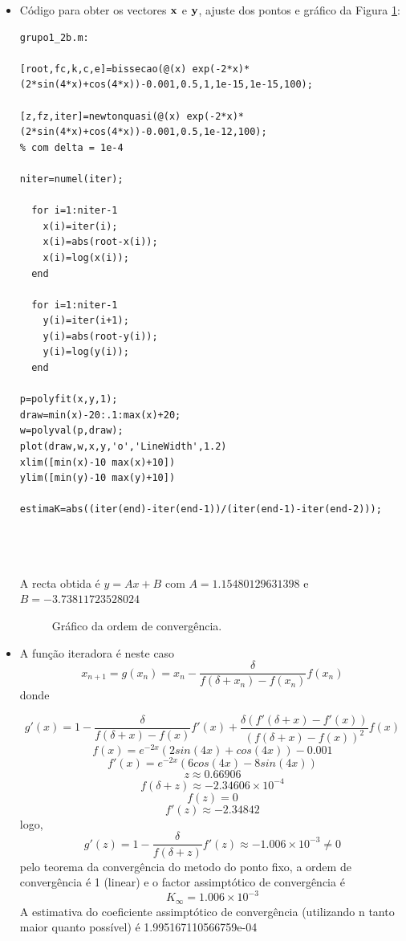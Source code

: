 \documentclass[a4paper,10pt]{extarticle}
\begin{document}
\begin{enumerate}
\begin{enumerate}
\begin{itemize}
\item Código para obter os vectores $\bf x$ e $\bf y$, ajuste dos pontos e gráfico da Figura \ref{fig:figura-pergunta1}:
{\small
\begin{verbatim}
grupo1_2b.m:

[root,fc,k,c,e]=bissecao(@(x) exp(-2*x)*(2*sin(4*x)+cos(4*x))-0.001,0.5,1,1e-15,1e-15,100);

[z,fz,iter]=newtonquasi(@(x) exp(-2*x)*(2*sin(4*x)+cos(4*x))-0.001,0.5,1e-12,100);
% com delta = 1e-4

niter=numel(iter);

  for i=1:niter-1
    x(i)=iter(i);
    x(i)=abs(root-x(i));
    x(i)=log(x(i));
  end

  for i=1:niter-1
    y(i)=iter(i+1);
    y(i)=abs(root-y(i));
    y(i)=log(y(i));
  end
  
p=polyfit(x,y,1);
draw=min(x)-20:.1:max(x)+20;
w=polyval(p,draw);
plot(draw,w,x,y,'o','LineWidth',1.2)
xlim([min(x)-10 max(x)+10])
ylim([min(y)-10 max(y)+10])

estimaK=abs((iter(end)-iter(end-1))/(iter(end-1)-iter(end-2)));




\end{verbatim}
}
A recta obtida é $y=A x+B$ com $A=1.15480129631398$ e $B=-3.73811723528024$
\begin{figure}[htb]
\centerline{ }
\caption{Gráfico da ordem de convergência.}
\label{fig:figura-pergunta1}
\end{figure}
\item A função iteradora é neste caso
\[x_{n+1}=g(x_n)= x_n-\frac{\delta}{f(\delta+x_n)-f(x_n)}f(x_n)
\]
donde 

\[g'(x)=1-\frac{\delta}{f(\delta+x)-f(x)}f'(x)+\frac{\delta(f'(\delta+x)-f'(x))}{(f(\delta+x)-f(x))^2}f(x)
\]
\[f(x)=e^{-2x}(2sin(4x)+cos(4x))-0.001
\]
\[f'(x)=e^{-2x}(6cos(4x)-8sin(4x))
\]
\[z\approx0.66906
\]
\[f(\delta+z)\approx-2.34606\times 10^{-4}
\]
\[f(z)=0
\]
\[f'(z)\approx-2.34842
\]
logo,
\[g'(z)=1-\frac{\delta}{f(\delta+z)}f'(z)\approx-1.006\times10^{-3}\neq0
\]
pelo teorema da convergência do metodo do ponto fixo, a ordem de convergência é \mbox{1} (linear) e o factor assimptótico de convergência é 
\[K_\infty=1.006\times10^{-3}
\]
A estimativa do coeficiente assimptótico de convergência (utilizando n tanto maior quanto possível) é \mbox{1.995167110566759e-04}
\end{itemize}


\end{enumerate}
\end{enumerate}
\end{document}
